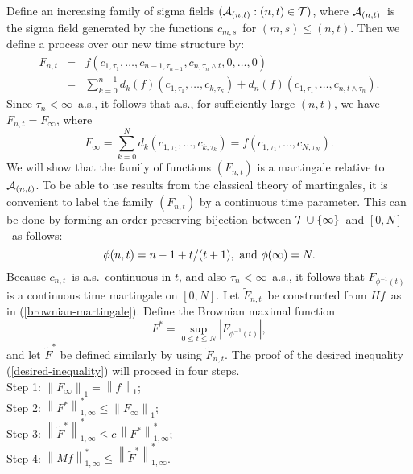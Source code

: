 Define an increasing family of sigma fields 
$({\cal A}_{(n,t)} : (n,t) \in 
{\cal T} )$, where
$ {\cal A}_{(n,t)} $\ is the sigma field generated by the functions $c_{m,s}$\
for $(m,s) \le (n,t)$.  
Then we define a process over our new time structure by:
\begin{eqnarray}
 F_{n,t} &=&  f(c_{1,\tau_1},\ldots,c_{n-1,\tau_{n-1}},
 c_{n,\tau_n\wedge t},0,\ldots,0) \nonumber   \\
 &=& \sum_{k=0}^{n-1}
   d_k(f) (c_{1,\tau_1},\dots,c_{k,\tau_k})
   + d_n (f) (c_{1,\tau_1},\dots,c_{n,t \wedge \tau_n}) .
\label{brownian-martingale}
\end{eqnarray}
Since $\tau_n < \infty$\ a.s., it follows that a.s.,
for sufficiently large
$(n,t)$, we have $F_{n,t} = F_\infty$, where
$$ F_\infty = \sum_{k=0}^N
   d_k(c_{1,\tau_1},\dots,c_{k,\tau_k}) = 
   f(c_{1,\tau_1},\dots,c_{N,\tau_N}).$$
We will show that the family of functions
$(F_{n,t})$ is a martingale relative to
$ {\cal A}_{(n,t)} $. To be able
to use results from the classical theory of 
martingales,
it is convenient to 
label the family $(F_{n,t})$ by a continuous 
time parameter.  This can be done by forming
an order
preserving bijection between ${\cal T} \cup \{\infty\}$\ and 
$[0,N]$\ as follows:
$$\phi(n,t) = n-1 + t/(t+1),\ {\rm and}\  \phi(\infty) = N.$$
Because $c_{n,t}$\ is a.s.\ continuous in $t$, and 
also $\tau_n < \infty$\ a.s., it follows that
$F_{\phi^{-1}(t)}$ is a
continuous time martingale on $[0,N]$.  
Let $\tilde F_{n,t}$\ be constructed from $H f$\ as in (\ref{brownian-martingale}).
Define the Brownian maximal function
$$ F^* = \sup_{0 \le t \le N} |F_{\phi^{-1}(t)}| ,$$
and let $\tilde F^*$ be defined similarly by using $\tilde F_{n,t}$.  
The proof of the desired inequality (\ref{desired-inequality}) 
will proceed in four steps.\\
Step 1:   $\left\| F_\infty \right\|_1 = \left\| f \right\|_1$;\\
Step 2:   $\left\| F^* \right\|^*_{1,\infty} \le   \left\| F_\infty \right\|_1$;\\
Step 3:   $\left\| \tilde F^* \right\|^*_{1,\infty} \le c \, \left\|
            F^* \right\|^*_{1,\infty}$;\\
Step 4:   $\left\| M f \right\|^*_{1,\infty} \le \left\| \tilde F^* 
            \right\|^*_{1,\infty}$.\\

